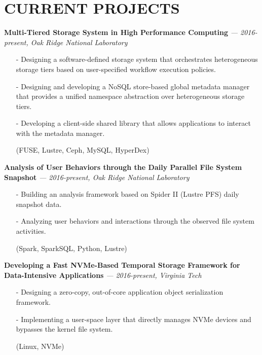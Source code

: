 \section{CURRENT PROJECTS}
\vspace{.03in}
  {\bf Multi-Tiered Storage System in High Performance Computing}
   {\it \footnotesize --- 2016-present, Oak Ridge National Laboratory}
   \begin{itemize}[leftmargin=*]
    \setlength\itemsep{-0.02in}
    \item[-] Designing a software-defined storage system that orchestrates
	     heterogeneous storage tiers based on user-specified workflow execution
             policies.
    \item[-] Designing and developing a NoSQL store-based global metadata manager
	     that provides a unified namespace abstraction over heterogeneous
	     storage tiers.
    \item[-] Developing a client-side shared library that allows applications to interact
             with the metadata manager.
    \item[] {\small(FUSE, Lustre, Ceph, MySQL, HyperDex)}
   \end{itemize}
  \vspace{-0.15in}
  {\bf Analysis of User Behaviors through the Daily Parallel File System Snapshot}
   {\it \footnotesize --- 2016-present, Oak Ridge National Laboratory}
   \begin{itemize}[leftmargin=*]
    \setlength\itemsep{-0.02in}
    \item[-] Building an analysis framework based on Spider II (Lustre PFS) daily snapshot data.
    \item[-] Analyzing user behaviors and interactions through the observed file system activities.
    \item[] {\small(Spark, SparkSQL, Python, Lustre)}
   \end{itemize}
  \vspace{-0.15in}
  {\bf Developing a Fast NVMe-Based Temporal Storage Framework for Data-Intensive Applications}
   {\it \footnotesize --- 2016-present, Virginia Tech}
   \begin{itemize}[leftmargin=*]
    \setlength\itemsep{-0.02in}
    \item[-] Designing a zero-copy, out-of-core application object serialization framework.
    \item[-] Implementing a user-space layer that directly manages NVMe
             devices and bypasses the kernel file system.
    \item[] {\small(Linux, NVMe)}
   \end{itemize}
 
